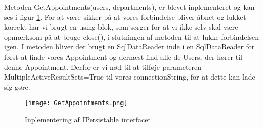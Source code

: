 Metoden GetAppointments(users, departments), er blevet inplementeret og kan ses i figur \ref{fig:GetAppointments}.
For at være sikker på at vores forbindelse bliver åbnet og lukket korrekt har vi brugt en using blok, som sørger for at vi ikke selv skal være opmærksom på at bruge close(), i slutningen af metoden til at lukke forbindelsen igen.
I metoden bliver der brugt en SqlDataReader inde i en SqlDataReader for først at finde vores Appointment og dernæst find alle de Users, der hører til denne Appointment.
Derfor er vi nød til at tilføje parameteren MultipleActiveResultSets=True til vores connectionString, for at dette kan lade sig gøre.

\begin{figure}[h]
    \caption{Inplementering af IPersistable interfacet}
    \centering
        \texttt{[image: GetAppointments.png]}
    \label{fig:GetAppointments}
\end{figure}
